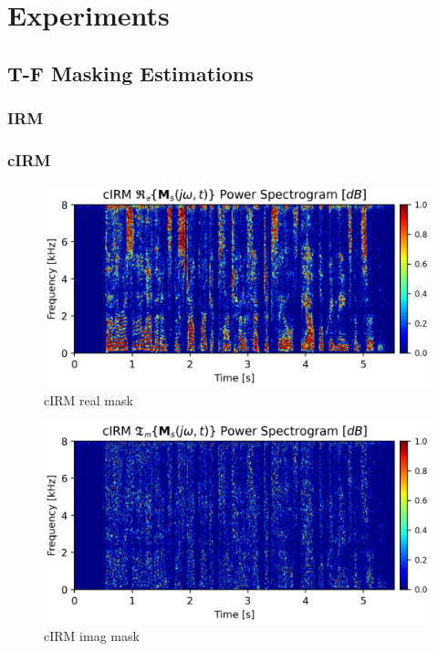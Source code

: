 \chapter{Experiments}
\section{T-F Masking Estimations}
\subsection{IRM}

\subsection{cIRM}

\begin{figure}[H]
    \centering
    \includegraphics[width=0.75\linewidth]{Features/images/cIRM_real_mask}
    \caption{cIRM real mask}\label{fig:asr_5}
\end{figure}

\begin{figure}[H]
    \centering
    \includegraphics[width=0.75\linewidth]{Features/images/cIRM_imag_mask}
    \caption{cIRM imag mask}\label{fig:asr_5}
\end{figure}

